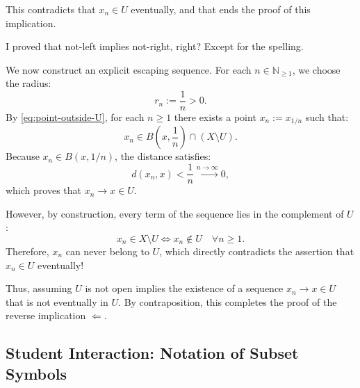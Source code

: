 \begin{proofWrapper}
\begin{speech}[00:50:46 - 00:52:28]
This contradicts that $x_n \in U$ eventually, and that ends the proof of this implication. 

I proved that not-left implies not-right, right? Except for the spelling. 
\end{speech}

\begin{content}
We now construct an explicit escaping sequence. For each $n \in \mathbb{N}_{\ge 1}$, we choose the radius:
\begin{equation}\label{eq:radius-1-over-n}
r_n := \frac{1}{n} > 0.
\end{equation}
By \eqref{eq:point-outside-U}, for each $n \ge 1$ there exists a point $x_n := x_{1/n}$ such that:
\begin{equation}\label{eq:escaping-sequence-def}
x_n \in B\left( x, \frac{1}{n} \right) \cap (X \setminus U).
\end{equation}
Because $x_n \in B(x, 1/n)$, the distance satisfies:
\[
d(x_n, x) < \frac{1}{n} \xrightarrow{n \to \infty} 0,
\]
which proves that $x_n \to x \in U$.

\par\vspace{1ex}\noindent
However, by construction, every term of the sequence lies in the complement of $U$:
\[
x_n \in X \setminus U \iff x_n \notin U \quad \forall n \ge 1.
\]
Therefore, $x_n$ can never belong to $U$, which directly contradicts the assertion that $x_n \in U$ eventually!

\par\vspace{1ex}\noindent
Thus, assuming $U$ is not open implies the existence of a sequence $x_n \to x \in U$ that is not eventually in $U$. By contraposition, this completes the proof of the reverse implication $\Leftarrow$.
\end{content}

\end{proofWrapper}

\begin{hidden}
\end{hidden}

\subsection{Student Interaction: Notation of Subset Symbols}

